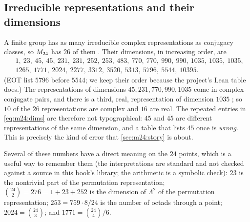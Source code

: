 \subsection*{Irreducible representations and their dimensions}
A finite group has as many irreducible complex representations as conjugacy classes, so
$M_{24}$ has $26$ of them . Their dimensions, in increasing order,
are 
\begin{equation}\label{eq:m24:dims}
\begin{aligned}
 &1,\ 23,\ 45,\ 45,\ 231,\ 231,\ 252,\ 253,\ 483,\ 770,\ 770,\ 990,\ 990,\ 1035,\ 1035,\ 1035,\\
 &1265,\ 1771,\ 2024,\ 2277,\ 3312,\ 3520,\ 5313,\ 5796,\ 5544,\ 10395 .
\end{aligned}
\end{equation}
(EOT list $5796$ before $5544$; we keep their order because the project's Lean table does.)
The representations of dimensions $45,231,770,990,1035$ come in complex-conjugate pairs,
and there is a third, real, representation of dimension $1035$ ; so $10$ of the $26$ representations are complex and $16$ are real.
The repeated entries in \eqref{eq:m24:dims} are therefore not typographical: $45$ and $\overline{45}$
are different representations of the same dimension, and a table that lists $45$ once is
\emph{wrong}. This is precisely the kind of error that \cref{sec:m24:story} is about.

Several of these numbers have a direct meaning on the $24$ points, which is a useful way to
remember them (the interpretations are standard and not checked against a source in this
book's library; the arithmetic is a symbolic check): $23$ is the nontrivial part of the
permutation representation; $\binom{24}2=276=1+23+252$ is the dimension of $\Lambda^2$ of
the permutation representation; $253=759\cdot8/24$ is the number of octads through a
point; $2024=\binom{24}3$; and $1771=\binom{24}4/6$.

